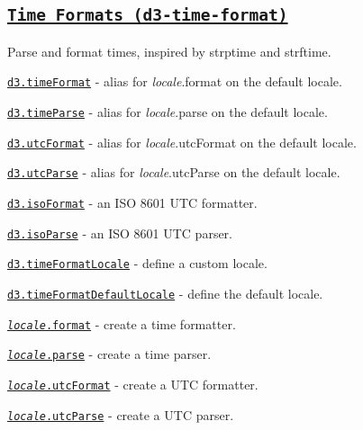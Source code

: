 \subsection*{\href{https://github.com/d3/d3-time-format}{\tt Time Formats (d3-\/time-\/format)}}

Parse and format times, inspired by strptime and strftime.


\begin{DoxyItemize}
\item \href{https://github.com/d3/d3-time-format/blob/master/README.md#timeFormat}{\tt d3.\+time\+Format} -\/ alias for {\itshape locale}.format on the default locale.
\item \href{https://github.com/d3/d3-time-format/blob/master/README.md#timeParse}{\tt d3.\+time\+Parse} -\/ alias for {\itshape locale}.parse on the default locale.
\item \href{https://github.com/d3/d3-time-format/blob/master/README.md#utcFormat}{\tt d3.\+utc\+Format} -\/ alias for {\itshape locale}.utc\+Format on the default locale.
\item \href{https://github.com/d3/d3-time-format/blob/master/README.md#utcParse}{\tt d3.\+utc\+Parse} -\/ alias for {\itshape locale}.utc\+Parse on the default locale.
\item \href{https://github.com/d3/d3-time-format/blob/master/README.md#isoFormat}{\tt d3.\+iso\+Format} -\/ an I\+SO 8601 U\+TC formatter.
\item \href{https://github.com/d3/d3-time-format/blob/master/README.md#isoParse}{\tt d3.\+iso\+Parse} -\/ an I\+SO 8601 U\+TC parser.
\item \href{https://github.com/d3/d3-time-format/blob/master/README.md#timeFormatLocale}{\tt d3.\+time\+Format\+Locale} -\/ define a custom locale.
\item \href{https://github.com/d3/d3-time-format/blob/master/README.md#timeFormatDefaultLocale}{\tt d3.\+time\+Format\+Default\+Locale} -\/ define the default locale.
\item \href{https://github.com/d3/d3-time-format/blob/master/README.md#locale_format}{\tt {\itshape locale}.format} -\/ create a time formatter.
\item \href{https://github.com/d3/d3-time-format/blob/master/README.md#locale_parse}{\tt {\itshape locale}.parse} -\/ create a time parser.
\item \href{https://github.com/d3/d3-time-format/blob/master/README.md#locale_utcFormat}{\tt {\itshape locale}.utc\+Format} -\/ create a U\+TC formatter.
\item \href{https://github.com/d3/d3-time-format/blob/master/README.md#locale_utcParse}{\tt {\itshape locale}.utc\+Parse} -\/ create a U\+TC parser.
\end{DoxyItemize}

